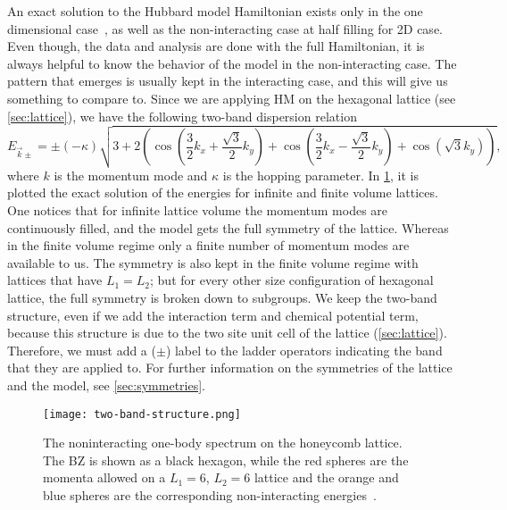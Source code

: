 An exact solution to the Hubbard model Hamiltonian exists only in the one dimensional case~\cite{hubexact}, as well as the non-interacting case at half filling for 2D case. Even though, the data and analysis are done with the full Hamiltonian, it is always helpful to know the behavior of the model in the non-interacting case. The pattern that emerges is usually kept in the interacting case, and this will give us something to compare to. Since we are applying HM on the hexagonal lattice (see \cref{sec:lattice}), we have the following two-band dispersion relation
\begin{equation}
    E_{\vec{k}\pm} = \pm (-\kappa) \sqrt{3 + 2 \left( \cos\left( \frac{3}{2}k_x + \frac{\sqrt{3}}{2}k_y \right) + \cos\left( \frac{3}{2}k_x - \frac{\sqrt{3}}{2}k_y \right) + \cos\left( \sqrt{3}k_y \right) \right)},
\end{equation}
where $k$ is the momentum mode and $\kappa$ is the hopping parameter. In \cref{fig:two-band}, it is plotted the exact solution of the energies for infinite and finite volume lattices. One notices that for infinite lattice volume the momentum modes are continuously filled, and the model gets the full symmetry of the lattice. Whereas in the finite volume regime only a finite number of momentum modes are available to us. The symmetry is also kept in the finite volume regime with lattices that have $L_1 = L_2$; but for every other size configuration of hexagonal lattice, the full symmetry is broken down to subgroups. We keep the two-band structure, even if we add the interaction term and chemical potential term, because this structure is due to the two site unit cell of the lattice (\ref{sec:lattice}). Therefore, we must add a ($\pm$) label to the ladder operators indicating the band that they are applied to. For further information on the symmetries of the lattice and the model, see \cref{sec:symmetries}.
\begin{figure}[htbp]
    \centerline{\texttt{[image: two-band-structure.png]}}
    \caption{The noninteracting one-body spectrum on the honeycomb lattice. The BZ is shown as a black hexagon, while the red spheres are the momenta allowed on a $L_1 = 6$, $L_2 = 6$ lattice and the orange and blue spheres are the corresponding non-interacting energies~\cite{evan}.}
    \label{fig:two-band}
\end{figure}


